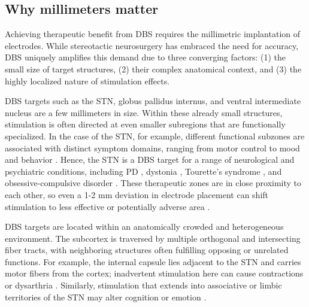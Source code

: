 \subsection{Why millimeters matter}
\label{sec:whymm}
Achieving therapeutic benefit from DBS requires the millimetric implantation of electrodes. While stereotactic neurosurgery has embraced the need for accuracy, DBS uniquely amplifies this demand due to three converging factors: (1) the small size of target structures, (2) their complex anatomical context, and (3) the highly localized nature of stimulation effects.

DBS targets such as the STN, globus pallidus internus, and ventral intermediate nucleus are a few millimeters in size. Within these already small structures, stimulation is often directed at even smaller subregions that are functionally specialized. In the case of the STN, for example, different functional subzones are associated with distinct symptom domains, ranging from motor control to mood and behavior \cite{Hollunder2024-wc}. Hence, the STN is a DBS target for a range of neurological and psychiatric conditions, including PD \cite{Deuschl2006-ar}, dystonia \cite{Ostrem2017-rw}, Tourette’s syndrome \cite{Mallet2008-ky}, and obsessive-compulsive disorder \cite{Dai2022-uy}. These therapeutic zones are in close proximity to each other, so even a 1-2 mm deviation in electrode placement can shift stimulation to less effective or potentially adverse area \cite{Akram2017-ru}.

DBS targets are located within an anatomically crowded and heterogeneous environment. The subcortex is traversed by multiple orthogonal and intersecting fiber tracts, with neighboring structures often fulfilling opposing or unrelated functions. For example, the internal capsule lies adjacent to the STN and carries motor fibers from the cortex; inadvertent stimulation here can cause contractions or dysarthria \cite{Tripoliti2011-ca}. Similarly, stimulation that extends into associative or limbic territories of the STN may alter cognition or emotion \cite{Mallet2007-ur}.


